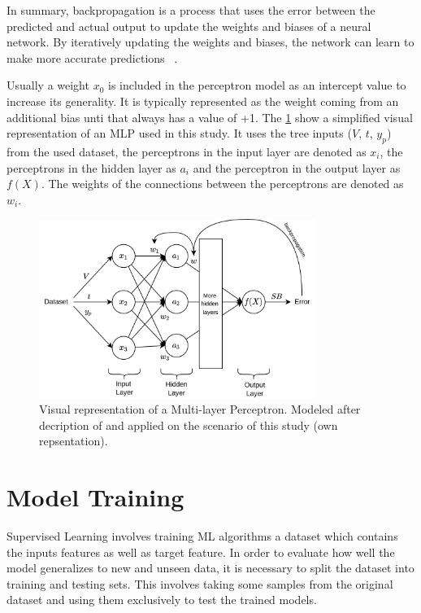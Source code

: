 In summary, backpropagation is a process that uses the error between the predicted and actual output to update the
weights and biases of a neural network.
By iteratively updating the weights and biases, the network can learn to make more accurate predictions
~\cite[p. 53--57]{nielsen2015neural}.

Usually a weight $x_0$ is included in the perceptron model as an intercept value to increase its generality.
It is typically represented as the weight coming from an additional bias unti that always has a value of +1.
The \cref{fig:mlp-example} show a simplified visual representation of an MLP used in this study.
It uses the tree inputs ($V$, $t$, $y_p$) from the used dataset, the perceptrons in the input layer are denoted as $
x_i$,
the perceptrons in the hidden layer as $a_i$ and the perceptron in the output layer as $f(X)$.
The weights of the connections between the perceptrons are denoted as $w_i$.

\begin{figure}[h]
    \begin{tcolorbox}[arc=0pt,boxrule=0.5pt]
        \centering
        \includegraphics[width=0.8\textwidth]{chap4/images/mlp_example}
    \end{tcolorbox}
    \caption{Visual representation of a Multi-layer Perceptron. Modeled after decription of
    \cite{nielsen2015neural} and applied on the scenario of this study
        (own repsentation). }
    \label{fig:mlp-example}
\end{figure}


\section{Model Training}\label{sec:model-training}
Supervised Learning involves training \ac{ML} algorithms a dataset which contains the inputs features as well
as target feature.
In order to evaluate how well the model generalizes to new and unseen data, it is necessary to
split the dataset into training and testing sets.
This involves taking some samples from the original dataset and using them exclusively to test the trained models.

